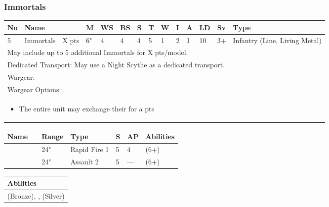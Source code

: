 \newpage
\subsubsection{Immortals}

\noindent
\begin{tabular}{||m{10pt} m{90pt} m{30pt} m{11pt} m{11pt} m{11pt} m{11pt} m{11pt} m{11pt} m{11pt} m{11pt} m{11pt} m{11pt} m{135pt}||}
	\hline
	No & Name & & M & WS & BS & S & T & W & I & A & LD & Sv & Type \\
	\hline
	5 & Immortals & X pts & 6" & 4 & 4 & 4 & 5 & 1 & 2 & 1 & 10 & 3+ & Infantry (Line, Living Metal)\\
	\hline
	\hline
	\multicolumn{14}{||Z{532 pt}||}{May include up to 5 additional Immortals for X pts/model.}\\	
	\multicolumn{14}{||Z{532 pt}||}{Dedicated Transport: May use a Night Scythe as a dedicated transport.}\\	
	\hline
	\hline
	\multicolumn{14}{||Z{532 pt}||}{Wargear: \quickref{Gauss Blaster}}\\
	\multicolumn{14}{||Z{532 pt}||}{Wargear Options:} \\	\multicolumn{14}{||Z{532 pt}||}{\begin{itemize}
			\item The entire unit may exchange their \quickref{Gauss Blaster} for a \quickref{Tesla Carbine} \hrulefill 0 pts
	\end{itemize}} \\
	\hline
\end{tabular}

\noindent
\begin{tabular}{||m{110pt} m{30pt} m{31pt} m{55pt} m{12pt} m{12pt} m{210pt}||}
	\hline
	Name & & Range & Type & S & AP & Abilities \\
	\hline
	\quickref{Gauss Blaster} & & 24" & Rapid Fire 1 & 5 & 4 & \quickref{Gauss} (6+) \\
	\quickref{Tesla Carbine} & & 24" & Assault 2 & 5 & — & \quickref{Tesla} (6+) \\
	\hline
\end{tabular}

\noindent
\begin{tabular}{||m{532pt}||}
	\hline
	Abilities \\
	\hline
	\quickref{Awakening Protocols} (Bronze), \quickref{Reanimation Protocols}, \quickref{Soulless Hordes} (Silver) \\
	\hline
\end{tabular}